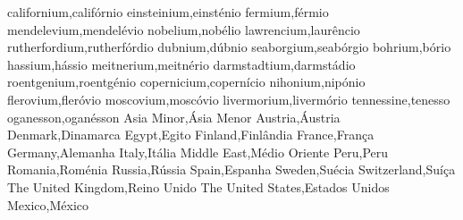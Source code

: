 californium,califórnio
einsteinium,einsténio
fermium,férmio
mendelevium,mendelévio
nobelium,nobélio
lawrencium,laurêncio
rutherfordium,rutherfórdio
dubnium,dúbnio
seaborgium,seabórgio
bohrium,bório
hassium,hássio
meitnerium,meitnério
darmstadtium,darmstádio
roentgenium,roentgénio
copernicium,copernício
nihonium,nipónio
flerovium,fleróvio
moscovium,moscóvio
livermorium,livermório
tennessine,tenesso
oganesson,oganésson
Asia Minor,Ásia Menor
Austria,Áustria
Denmark,Dinamarca
Egypt,Egito
Finland,Finlândia
France,França
Germany,Alemanha
Italy,Itália
Middle East,Médio Oriente
Peru,Peru
Romania,Roménia
Russia,Rússia
Spain,Espanha
Sweden,Suécia
Switzerland,Suíça
The United Kingdom,Reino Unido
The United States,Estados Unidos
Mexico,México
